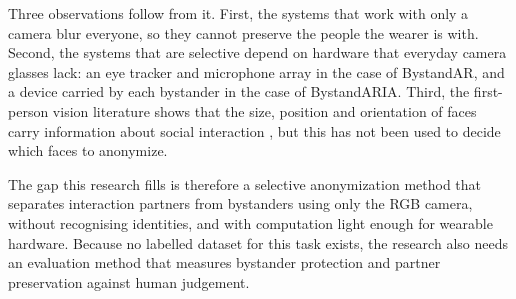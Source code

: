 \begin{table}[htbp]
\begin{singlespace}
\centering
\caption{Comparison of related bystander privacy systems.}
\label{tab:related_work}
\renewcommand{\arraystretch}{1.3}
\end{singlespace}
\end{table}

Three observations follow from it. First, the systems that work with only a camera blur
everyone, so they cannot preserve the people the wearer is with. Second, the systems that
are selective depend on hardware that everyday camera glasses lack: an eye tracker and
microphone array in the case of BystandAR, and a device carried by each bystander in the
case of BystandARIA. Third, the first-person vision literature shows that the size,
position and orientation of faces carry information about social interaction
\cite{fathi2012social,li2013gaze}, but this has not been used to decide which faces to
anonymize.

The gap this research fills is therefore a selective anonymization method that separates
interaction partners from bystanders using only the RGB camera, without recognising
identities, and with computation light enough for wearable hardware. Because no labelled
dataset for this task exists, the research also needs an evaluation method that measures
bystander protection and partner preservation against human judgement.
